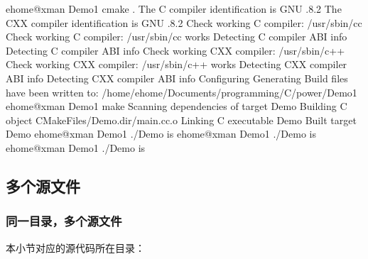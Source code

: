 \documentclass[a4paper,12pt,english]{sphinxmanual}
\begin{document}
\begin{sphinxVerbatim}[commandchars=\\\{\}]
\PYG{o}{[}ehome@xman Demo1\PYG{o}{]}\PYGZdl{} cmake .
\PYGZhy{}\PYGZhy{} The C compiler identification is GNU .8.2
\PYGZhy{}\PYGZhy{} The CXX compiler identification is GNU .8.2
\PYGZhy{}\PYGZhy{} Check  working C compiler: /usr/sbin/cc
\PYGZhy{}\PYGZhy{} Check  working C compiler: /usr/sbin/cc \PYGZhy{}\PYGZhy{} works
\PYGZhy{}\PYGZhy{} Detecting C compiler ABI info
\PYGZhy{}\PYGZhy{} Detecting C compiler ABI info \PYGZhy{} 
\PYGZhy{}\PYGZhy{} Check  working CXX compiler: /usr/sbin/c++
\PYGZhy{}\PYGZhy{} Check  working CXX compiler: /usr/sbin/c++ \PYGZhy{}\PYGZhy{} works
\PYGZhy{}\PYGZhy{} Detecting CXX compiler ABI info
\PYGZhy{}\PYGZhy{} Detecting CXX compiler ABI info \PYGZhy{} 
\PYGZhy{}\PYGZhy{} Configuring 
\PYGZhy{}\PYGZhy{} Generating 
\PYGZhy{}\PYGZhy{} Build files have been written to: /home/ehome/Documents/programming/C/power/Demo1
\PYG{o}{[}ehome@xman Demo1\PYG{o}{]}\PYGZdl{} make
Scanning dependencies of target Demo
\PYG{o}{[}\PYGZpc{}\PYG{o}{]} Building C object CMakeFiles/Demo.dir/main.cc.o
Linking C executable Demo
\PYG{o}{[}\PYGZpc{}\PYG{o}{]} Built target Demo
\PYG{o}{[}ehome@xman Demo1\PYG{o}{]}\PYGZdl{} ./Demo  
 \PYGZca{}  is 
\PYG{o}{[}ehome@xman Demo1\PYG{o}{]}\PYGZdl{} ./Demo  
 \PYGZca{}  is 
\PYG{o}{[}ehome@xman Demo1\PYG{o}{]}\PYGZdl{} ./Demo  
 \PYGZca{}  is 
\end{sphinxVerbatim}


\subsection{多个源文件}
\label{\detokenize{dev-board/cmake:id3}}

\subsubsection{同一目录，多个源文件}
\label{\detokenize{dev-board/cmake:id4}}
\sphinxAtStartPar
本小节对应的源代码所在目录：
\begin{quote}

\sphinxAtStartPar
{}
\end{quote}
\end{document}
